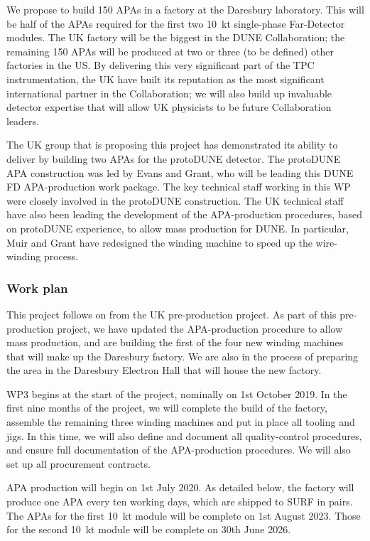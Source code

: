 We propose to build 150 APAs in a factory at the Daresbury laboratory. This will be half of the APAs required for the first two \SI{10}{\kilo\tonne} single-phase Far-Detector modules. The UK factory will be the biggest in the DUNE Collaboration; the remaining 150 APAs will be produced at two or three (to be defined) other factories in the US. By delivering this very significant part of the TPC instrumentation, the UK have built its reputation as the most significant international partner in the Collaboration; we will also build up invaluable detector expertise that will allow UK physicists to be future Collaboration leaders.

The UK group that is proposing this project has demonstrated its ability to deliver by building two APAs for the protoDUNE detector. The protoDUNE APA construction was led by Evans and Grant, who will be leading this DUNE FD APA-production work package. The key technical staff working in this WP were closely involved in the protoDUNE construction. The UK technical staff have also been leading the development of the APA-production procedures, based on protoDUNE experience, to allow mass production for DUNE. In particular, Muir and Grant have redesigned the winding machine to speed up the wire-winding process. 


\subsubsection{Work plan}

This project follows on from the UK pre-production project. As part of this pre-production project, we have updated the APA-production procedure to allow mass production, and are building the first of the four new winding machines that will make up the Daresbury factory. We are also in the process of preparing the area in the Daresbury Electron Hall that will house the new factory.

WP3 begins at the start of the project, nominally on 1st October 2019. In the first nine months of the project, we will complete the build of the factory, assemble the remaining three winding machines and put in place all tooling and jigs. In this time, we will also define and document all quality-control procedures, and ensure full documentation of the APA-production procedures. We will also set up all procurement contracts.

APA production will begin on 1st July 2020. As detailed below, the factory will produce one APA every ten working days, which are shipped to SURF in pairs. The APAs for the first \SI{10}{\kilo\tonne} module will be complete on 1st August 2023. Those for the second \SI{10}{\kilo\tonne} module will be complete on 30th June 2026.


